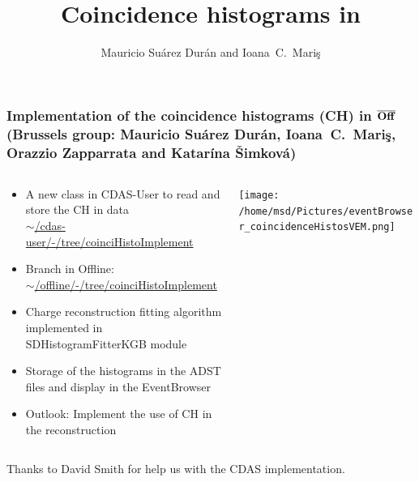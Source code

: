 \documentclass[aspectratio=169]{beamer}
\title{Coincidence histograms in \Offline}
\author{
  Mauricio Su\'arez Dur\'an and Ioana~C.~Mari\c{s}
}
\institute{IIHE-ULB}
\def\OfflineB{\mbox{$\bf\overline{\rm\bf
Off}$\hspace{.05em}\raisebox{.2ex}{$\bf\underline{\rm\bf line}$}}\xspace}
\begin{document}


\begin{frame}
  \frametitle{Implementation of the coincidence histograms (CH) in
  \OfflineB  \\ {\small (Brussels group: Mauricio Su\'arez Dur\'an,
  Ioana~C.~Mari\c{s}, Orazzio Zapparrata and Katar\'ina
  \v{S}imkov\'a)}}
  \vspace{0.2cm}

  \begin{columns}
    \centering
    \begin{column}{0.5\textwidth}
      \begin{itemize}
        \item A new class in CDAS-User to read and store the CH in data\\
          \href{https://gitlab.iap.kit.edu/auger-observatory/cdas/cdas-user/-/tree/coinciHistoImplement}
          {\small $\sim$/cdas-user/-/tree/coinciHistoImplement}
        \item Branch in Offline:\\
          \href{https://gitlab.iap.kit.edu/auger-observatory/offline/offline/-/tree/coinciHistoImplement}
          {\small $\sim$/offline/-/tree/coinciHistoImplement}
        \item Charge reconstruction fitting algorithm implemented in SDHistogramFitterKGB module
        \item Storage of the histograms in the ADST files and display in the EventBrowser
        \item Outlook: Implement the use of CH in the reconstruction
      \end{itemize}
    \end{column} 
    \begin{column}{0.7\textwidth}
      \texttt{[image: /home/msd/Pictures/eventBrowser\_coincidenceHistosVEM.png]}
    \end{column}
  \end{columns}
  \vspace{0.3cm}

  Thanks to David Smith for help us with the CDAS implementation.
\end{frame}
\end{document}
